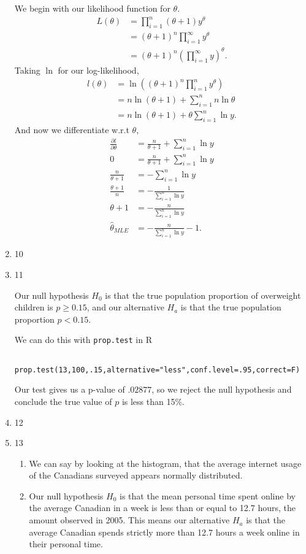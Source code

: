 \documentclass{article}
\begin{document}
\begin{enumerate}
    We begin with our likelihood function for $\theta$.
    \begin{align*}
        L(\theta)&= \prod_{i=1}^{n} (\theta+1)y^{\theta}  \\
        &= (\theta+1)^{n}\prod_{i=1}^{\infty} y^{\theta} \\
        &= (\theta+1)^{n}\left(\prod_{i=1}^{\infty} y\right)^{\theta} 
    .\end{align*}
    Taking $\ln$ for our log-likelihood,
    \begin{align*}
        l(\theta)&=\ln\left( (\theta+1)^{n}\prod_{i=1}^{n} y^{\theta}  \right) \\
        &= n\ln(\theta+1)+\sum_{i=1}^{n} n\ln\theta \\
        &= n\ln(\theta+1)+\theta\sum_{i=1}^{n} \ln y 
    .\end{align*}
    And now we differentiate w.r.t $\theta$,
    \begin{align*}
        \frac{\partial l}{\partial \theta} &= \frac{n}{\theta+1}+ \sum_{i=1}^{n} \ln y \\
        0&= \frac{n}{\theta+1}+ \sum_{i=1}^{n} \ln y \\
        \frac{n}{\theta+1}&= - \sum_{i=1}^{n} \ln y \\
        \frac{\theta+1}{n}  &= - \frac{1}{\sum_{i=1}^{n} \ln y} \\
        \theta+1&= - \frac{n}{\sum_{i=1}^{n} \ln y} \\
        \hat{\theta}_{MLE}&= - \frac{n}{\sum_{i=1}^{n} \ln y}-1 
    .\end{align*}

\item 10
\item 11

    Our null hypothesis $H_0$ is that the true population proportion of overweight children is
    $p\geq 0.15$, and our alternative $H_a$ is that the true population proportion $p<0.15$.

We can do this with \verb|prop.test| in R
\begin{verbatim}
    prop.test(13,100,.15,alternative="less",conf.level=.95,correct=F)
\end{verbatim}
Our test gives us a p-value of $.02877$, so we reject the null hypothesis and conclude the true value
of $p$ is less than 15\%.
\item 12
\item 13

    \begin{enumerate}[label= (\alph*)] 
        \item 
            We can say by looking at the histogram, that the average internet usage of the Canadians
            surveyed appears normally distributed.
        \item 
            Our null hypothesis $H_0$ is that the mean personal time spent online by the average 
            Canadian in a week is less than or equal to 12.7 hours, the amount observed in 2005.
            This means our alternative $H_a$ is that the average Canadian spends strictly more than 
            12.7 hours a week online in their personal time.


\end{enumerate}
\end{enumerate}
\end{document}
